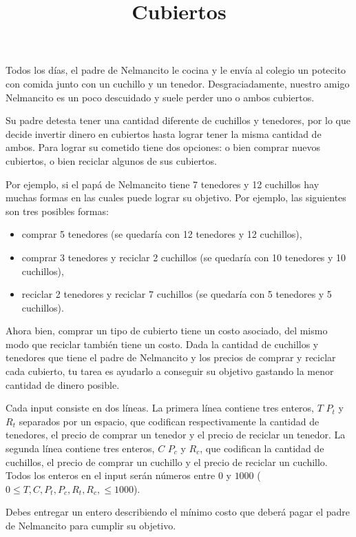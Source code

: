 \documentclass{oci}
\title{Cubiertos}
\begin{document}
\begin{problemDescription}
Todos los días, el padre de Nelmancito le cocina y le envía al colegio un potecito con comida junto con un cuchillo y un tenedor. Desgraciadamente, nuestro amigo Nelmancito es un poco descuidado y suele perder uno o ambos cubiertos.

Su padre detesta tener una cantidad diferente de cuchillos y tenedores, por lo que decide invertir dinero en cubiertos hasta lograr tener la misma cantidad de ambos. Para lograr su cometido tiene dos opciones: o bien comprar nuevos cubiertos, o bien reciclar algunos de sus cubiertos.

Por ejemplo, si el papá de Nelmancito tiene 7 tenedores y 12 cuchillos hay muchas formas en las cuales puede lograr su objetivo. Por ejemplo, las siguientes son tres posibles formas: 
\begin{itemize}
	\item comprar 5 tenedores (se quedaría con 12 tenedores y 12 cuchillos),
	\item comprar 3 tenedores y reciclar 2 cuchillos (se quedaría con 10 tenedores y 10 cuchillos),
	\item reciclar 2 tenedores y reciclar 7 cuchillos (se quedaría con 5 tenedores y 5 cuchillos).
\end{itemize}

Ahora bien, comprar un tipo de cubierto tiene un costo asociado, del mismo modo que reciclar también tiene un costo. 
Dada la cantidad de cuchillos y tenedores que tiene el padre de Nelmancito y los precios de comprar y reciclar cada cubierto, tu tarea
es ayudarlo a conseguir su objetivo gastando la menor cantidad de dinero posible.


\end{problemDescription}

\begin{inputDescription}
Cada input consiste en dos líneas. La primera línea contiene tres enteros, $T$
$P_t$ y $R_t$ separados por un espacio, que codifican respectivamente la
cantidad de tenedores, el precio de comprar un tenedor y el precio de reciclar
un tenedor. La segunda línea contiene tres enteros, $C$ $P_c$ y
$R_c$, que codifican la cantidad de cuchillos, el precio de comprar un cuchillo
y el precio de reciclar un cuchillo.
Todos los enteros en el input serán números entre $0$ y $1000$ ($0\leq T,C,P_t,P_c,R_t,R_c, \leq 1000$).
\end{inputDescription}

\begin{outputDescription}
Debes entregar un entero describiendo el mínimo costo que deberá pagar el padre de Nelmancito para cumplir su objetivo.
\end{outputDescription}
\end{document}
